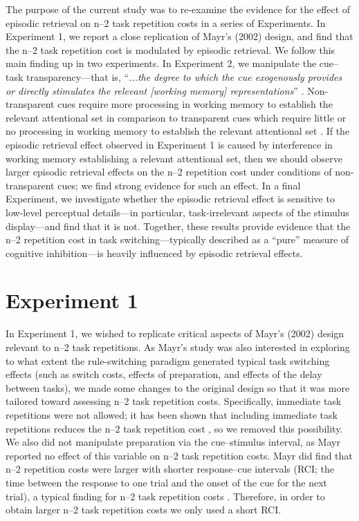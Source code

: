 \documentclass[a4paper, doc, natbib]{apa6}
\begin{document}
The purpose of the current study was to re-examine the evidence for the effect of episodic retrieval on n--2 task repetition costs in a series of Experiments. In Experiment 1, we report a close replication of Mayr's (2002) design, and find that the n--2 task repetition cost is modulated by episodic retrieval. We follow this main finding up in two experiments. In Experiment 2, we manipulate the cue--task transparency---that is, ``\emph{...the degree to which the cue exogenously provides or directly stimulates the relevant [working memory] representations}'' \citep[][p.1004]{Grange2009}. Non-transparent cues require more processing in working memory to establish the relevant attentional set in comparison to transparent cues which require little or no processing in working memory to establish the relevant attentional set \citep[e.g.,][]{Grange2009, Grange2010, Grange2015a, Houghton2009, Mayr2000a}. If the episodic retrieval effect observed in Experiment 1 is caused by interference in working memory establishing a relevant attentional set, then we should observe larger episodic retrieval effects on the n--2 repetition cost under conditions of non-transparent cues; we find strong evidence for such an effect. In a final Experiment, we investigate whether the episodic retrieval effect is sensitive to low-level perceptual details---in particular, task-irrelevant aspects of the stimulus display---and find that it is not. Together, these results provide evidence that the n--2 repetition cost in task switching---typically described as a ``pure'' measure of cognitive inhibition---is heavily influenced by episodic retrieval effects.   

\section{Experiment 1}

In Experiment 1, we wished to replicate critical aspects of Mayr's (2002) design relevant to n--2 task repetitions. As Mayr's study was also interested in exploring to what extent the rule-switching paradigm generated typical task switching effects (such as switch costs, effects of preparation, and effects of the delay between tasks), we made some changes to the original design so that it was more tailored toward assessing n--2 task repetition costs. Specifically, immediate task repetitions were not allowed; it has been shown that including immediate task repetitions reduces the n--2 task repetition cost \citep{Philipp2006}, so we removed this possibility. We also did not manipulate preparation via the cue--stimulus interval, as Mayr reported no effect of this variable on n--2 task repetition costs. Mayr did find that n--2 repetition costs were larger with shorter response--cue intervals (RCI; the time between the response to one trial and the onset of the cue for the next trial), a typical finding for n--2 task repetition costs \citep{Gade2005, Grange2009, Mayr2000}. Therefore, in order to obtain larger n--2 task repetition costs we only used a short RCI. 
\end{document}
